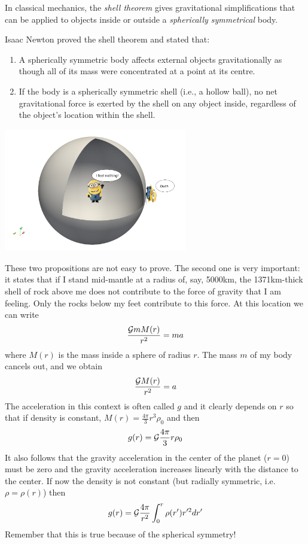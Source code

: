 
In classical mechanics, the {\it shell theorem} gives 
gravitational simplifications that can be applied to objects inside or outside a 
{\it spherically symmetrical} body. 

Isaac Newton proved the shell theorem and stated that:
\begin{enumerate}
\item A spherically symmetric body affects external objects gravitationally as though all of its mass were concentrated at a point at its centre.
\item If the body is a spherically symmetric shell (i.e., a hollow ball), no net gravitational force is exerted by the shell on any object inside, regardless of the object's location within the shell.
\end{enumerate}

\begin{center}
\includegraphics[width=8cm]{images/gravity/drawing}
\end{center}

These two propositions are not easy to prove. The second one is very important: it states
that if I stand mid-mantle at a radius of, say, 5000\si{\kilo\metre}, the 1371\si{\kilo\metre}-thick 
shell of rock above me does not contribute to the force of gravity that I am feeling. 
Only the rocks below my feet contribute to this force.
At this location we can write
\[
\frac{{\cal G}m M(r)}{r^2} = m a
\]
where $M(r)$ is the mass inside a sphere of radius $r$. The mass $m$ of my body cancels out, and we
obtain 
\[
\frac{{\cal G} M(r)}{r^2} = a
\]
The acceleration in this context is often called $g$ and it clearly depends on $r$ so that 
if density is constant, $M(r)=\frac{4\pi}{3}r^3\rho_0$ and then 
\[
g(r) = {\cal G} \frac{4\pi}{3}r\rho_0
\]
It also follows that the gravity acceleration in the center of the planet ($r=0$) must be zero and 
the gravity acceleration increases linearly with the distance to the center. 
If now the density is not constant (but radially symmetric, i.e. $\rho=\rho(r)$) then 
\[
g(r) =  {\cal G} \frac{4\pi}{r^2} \int_0^r \rho(r') r'^2 dr'
\]
Remember that this is true because of the spherical symmetry!

